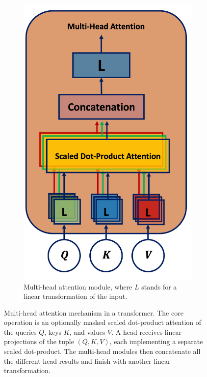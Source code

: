 \begin{figure}[h!]
\begin{subfigure}[b]{0.5\textwidth}
        \includegraphics[scale=0.65]{Images/ML/multiHeadAtt.png}
        \caption{Multi-head attention module, where $L$ stands for a linear transformation of the input.} 
        \label{fig:mulitheadAtt}
    \end{subfigure}
    \caption{Multi-head attention mechanism in a transformer. The core operation is an optionally masked scaled dot-product attention of the queries $Q$, keys $K$, and values $V$. A head receives linear projections of the tuple $(Q, K, V)$, each implementing a separate scaled dot-product. The multi-head modules then concatenate all the different head results and finish with another linear transformation.}
    \label{fig:transAtt}
\end{figure} 

